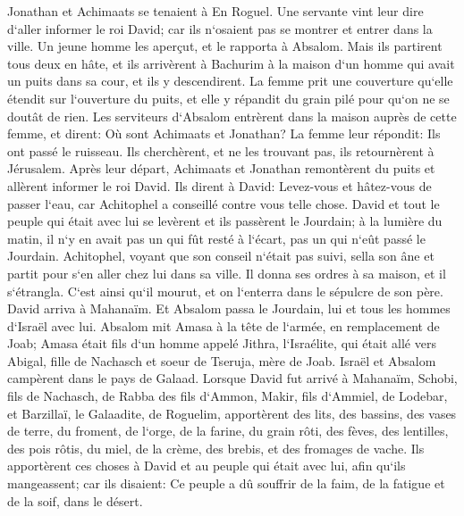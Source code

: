 \verse Jonathan et Achimaats se tenaient à En Roguel. Une servante vint leur dire d`aller informer le roi David; car ils n`osaient pas se montrer et entrer dans la ville. 
\verse Un jeune homme les aperçut, et le rapporta à Absalom. Mais ils partirent tous deux en hâte, et ils arrivèrent à Bachurim à la maison d`un homme qui avait un puits dans sa cour, et ils y descendirent. 
\verse La femme prit une couverture qu`elle étendit sur l`ouverture du puits, et elle y répandit du grain pilé pour qu`on ne se doutât de rien. 
\verse Les serviteurs d`Absalom entrèrent dans la maison auprès de cette femme, et dirent: Où sont Achimaats et Jonathan? La femme leur répondit: Ils ont passé le ruisseau. Ils cherchèrent, et ne les trouvant pas, ils retournèrent à Jérusalem. 
\verse Après leur départ, Achimaats et Jonathan remontèrent du puits et allèrent informer le roi David. Ils dirent à David: Levez-vous et hâtez-vous de passer l`eau, car Achitophel a conseillé contre vous telle chose. 
\verse David et tout le peuple qui était avec lui se levèrent et ils passèrent le Jourdain; à la lumière du matin, il n`y en avait pas un qui fût resté à l`écart, pas un qui n`eût passé le Jourdain. 
\verse Achitophel, voyant que son conseil n`était pas suivi, sella son âne et partit pour s`en aller chez lui dans sa ville. Il donna ses ordres à sa maison, et il s`étrangla. C`est ainsi qu`il mourut, et on l`enterra dans le sépulcre de son père. 
\verse David arriva à Mahanaïm. Et Absalom passa le Jourdain, lui et tous les hommes d`Israël avec lui. 
\verse Absalom mit Amasa à la tête de l`armée, en remplacement de Joab; Amasa était fils d`un homme appelé Jithra, l`Israélite, qui était allé vers Abigal, fille de Nachasch et soeur de Tseruja, mère de Joab. 
\verse Israël et Absalom campèrent dans le pays de Galaad. 
\verse Lorsque David fut arrivé à Mahanaïm, Schobi, fils de Nachasch, de Rabba des fils d`Ammon, Makir, fils d`Ammiel, de Lodebar, et Barzillaï, le Galaadite, de Roguelim, 
\verse apportèrent des lits, des bassins, des vases de terre, du froment, de l`orge, de la farine, du grain rôti, des fèves, des lentilles, des pois rôtis, 
\verse du miel, de la crème, des brebis, et des fromages de vache. Ils apportèrent ces choses à David et au peuple qui était avec lui, afin qu`ils mangeassent; car ils disaient: Ce peuple a dû souffrir de la faim, de la fatigue et de la soif, dans le désert. 

\chapter{}

